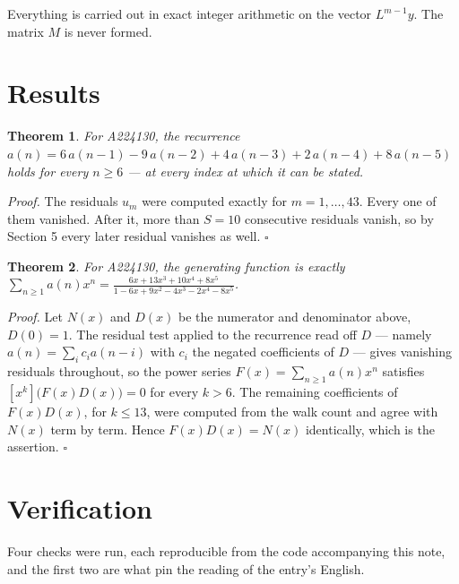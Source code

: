 \documentclass[11pt]{article}
\newtheorem{theorem}{Theorem}
\theoremstyle{definition}
\begin{document}
Everything is carried out in exact integer arithmetic on the vector $L^{m-1}y$. The matrix $M$ is never formed.

\section{Results}

\begin{theorem} For A224130, the recurrence $a(n) = 6\,a(n-1) - 9\,a(n-2) + 4\,a(n-3) + 2\,a(n-4) + 8\,a(n-5)$ holds for every $n \ge 6$ --- at every index at which it can be stated.\end{theorem}

{\itshape Proof.} The residuals $u_m$ were computed exactly for $m = 1,\dots,43$. Every one of them vanished. After it, more than $S = 10$ consecutive residuals vanish, so by Section 5 every later residual vanishes as well. $\square$

\begin{theorem} For A224130, the generating function is exactly $\sum_{n\ge 1} a(n)x^n = \frac{6x + 13x^{3} + 10x^{4} + 8x^{5}}{1 - 6x + 9x^{2} - 4x^{3} - 2x^{4} - 8x^{5}}$.\end{theorem}

{\itshape Proof.} Let $N(x)$ and $D(x)$ be the numerator and denominator above, $D(0)=1$. The residual test applied to the recurrence read off $D$ --- namely $a(n) = \sum_i c_i a(n-i)$ with $c_i$ the negated coefficients of $D$ --- gives vanishing residuals throughout, so the power series $F(x)=\sum_{n\ge 1}a(n)x^n$ satisfies $[x^k]\bigl(F(x)D(x)\bigr) = 0$ for every $k > 6$. The remaining coefficients of $F(x)D(x)$, for $k \le 13$, were computed from the walk count and agree with $N(x)$ term by term. Hence $F(x)D(x) = N(x)$ identically, which is the assertion. $\square$

\section{Verification}

Four checks were run, each reproducible from the code accompanying this note, and the first two are what pin the reading of the entry's English.
\end{document}

